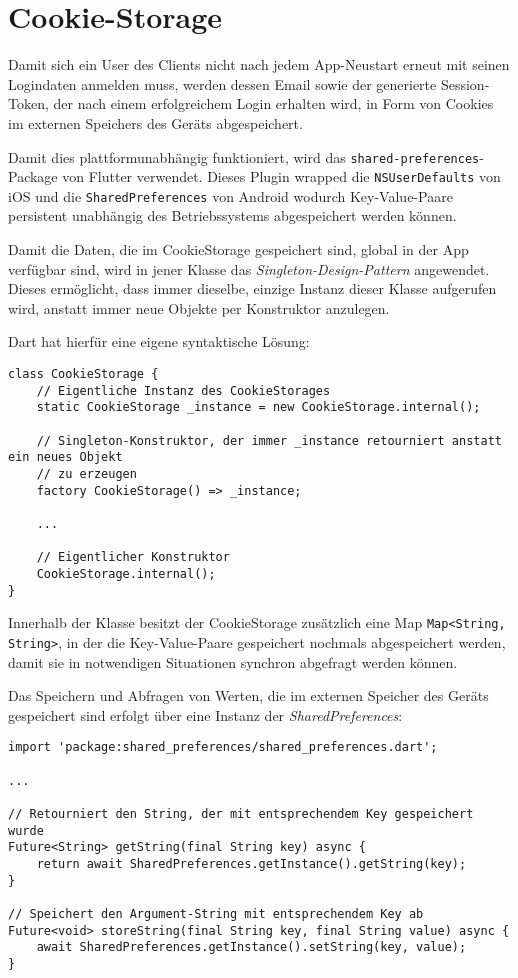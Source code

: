 \section{Cookie-Storage}

Damit sich ein User des Clients nicht nach jedem App-Neustart erneut mit seinen Logindaten anmelden muss,
werden dessen Email sowie der generierte Session-Token, der nach einem erfolgreichem Login erhalten wird, 
in Form von Cookies im externen Speichers des Geräts abgespeichert.


Damit dies plattformunabhängig funktioniert, wird das \lstinline{shared-preferences}-Package von Flutter
verwendet.
Dieses Plugin wrapped die \lstinline{NSUserDefaults} von iOS und die \lstinline{SharedPreferences} von Android
wodurch Key-Value-Paare persistent unabhängig des Betriebssystems abgespeichert werden können.

Damit die Daten, die im CookieStorage gespeichert sind, global in der App verfügbar sind, wird in jener
Klasse das \textit{Singleton-Design-Pattern} angewendet. Dieses ermöglicht, dass immer dieselbe, einzige Instanz
dieser Klasse aufgerufen wird, anstatt immer neue Objekte per Konstruktor anzulegen.

Dart hat hierfür eine eigene syntaktische Lösung:

\begin{lstlisting}
class CookieStorage {
    // Eigentliche Instanz des CookieStorages
    static CookieStorage _instance = new CookieStorage.internal();

    // Singleton-Konstruktor, der immer _instance retourniert anstatt ein neues Objekt
    // zu erzeugen
    factory CookieStorage() => _instance;

    ...

    // Eigentlicher Konstruktor
    CookieStorage.internal();
}
\end{lstlisting}

Innerhalb der Klasse besitzt der CookieStorage zusätzlich eine Map \lstinline{Map<String, String>}, in der die Key-Value-Paare
gespeichert nochmals abgespeichert werden, damit sie in notwendigen Situationen synchron abgefragt werden können.

Das Speichern und Abfragen von Werten, die im externen Speicher des Geräts gespeichert sind erfolgt über
eine Instanz der \textit{SharedPreferences}:

\begin{lstlisting}
import 'package:shared_preferences/shared_preferences.dart';

...

// Retourniert den String, der mit entsprechendem Key gespeichert wurde
Future<String> getString(final String key) async {
    return await SharedPreferences.getInstance().getString(key);
}

// Speichert den Argument-String mit entsprechendem Key ab
Future<void> storeString(final String key, final String value) async {
    await SharedPreferences.getInstance().setString(key, value);
}
\end{lstlisting}

